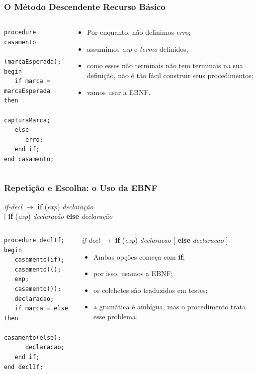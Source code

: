 \documentclass[table]{beamer}
\begin{document}
\begin{frame}[fragile]
   \frametitle{O Método Descendente Recurso Básico}
   \small
   \begin{columns}
   \begin{column}{0.5\textwidth}
   \begin{verbatim}
procedure casamento 
         (marcaEsperada);
begin
   if marca = marcaEsperada then
      capturaMarca;
   else
      erro;
   end if;
end casamento;
   \end{verbatim}
   \end{column}
   \begin{column}{0.5\textwidth}
   \begin{itemize}
      \item Por enquanto, não definimos \textit{erro};
      \item assumimos \textit{exp} e \textit{termo} definidos;
      \item como esses não terminais não tem terminais na sua definição, não é tão fácil construir seus procedimentos;
      \item vamos usar a EBNF.
   \end{itemize}
   \end{column}
   \end{columns}
\end{frame}

\begin{frame}[fragile]
   \frametitle{Repetição e Escolha: o Uso da EBNF}
   \textit{if-decl} $\to$ \textbf{if} (\textit{exp}) \textit{declaração} \\
   $|$ \textbf{if} (\textit{exp}) \textit{declaração} \textbf{else} \textit{declaração}
   \begin{columns}
   \begin{column}{0.5\textwidth}
   \begin{verbatim}
procedure declIf;
begin
   casamento(if);
   casamento(();
   exp;
   casamento());
   declaracao;
   if marca = else then
      casamento(else);
      declaracao;
   end if;
end declIf;
   \end{verbatim}
   \end{column}
   \begin{column}{0.5\textwidth}
   \textit{if-decl} $\to$ \textbf{if} (\textit{exp}) \textit{declaracao} [ \textbf{else} \textit{declaracao} ]
   \begin{itemize}
      \item Ambas opções começa com \textbf{if};
      \item por isso, usamos a EBNF;
      \item os colchetes são traduzidos em testes;
      \item a gramática é ambígua, mas o procedimento trata esse problema.
   \end{itemize}
   \end{column}
   \end{columns}
\end{frame}
\end{document}
